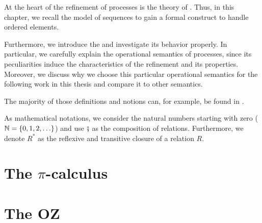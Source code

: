 At the heart of the refinement of \findex{\picalc{}} processes is the theory of . Thus, in this chapter, we recall the model of sequences to gain a formal construct to handle ordered elements.%

Furthermore, we introduce the \picalc{} and investigate its behavior properly. In particular, we carefully explain the operational semantics of \picalc{} processes, since its peculiarities induce the characteristics of the refinement and its properties. Moreover, we discuss why we choose this particular operational semantics for the following work in this thesis and compare it to other semantics.

The majority of those definitions and notions can, for example, be found in \cite{milner,sangiorgi}.

As mathematical notations, we consider the natural numbers starting with zero ($\N=\set{0,1,2,\ldots}$) and use $\fatsemi$ as the composition of relations. Furthermore, we denote $R^*$ as the reflexive and transitive closure of a relation $R$.


\section{The \texorpdfstring{$\pi$}{pi}-calculus}
\label{sec_pi_calculus}


\section{The OZ}
\label{sec_oz}



